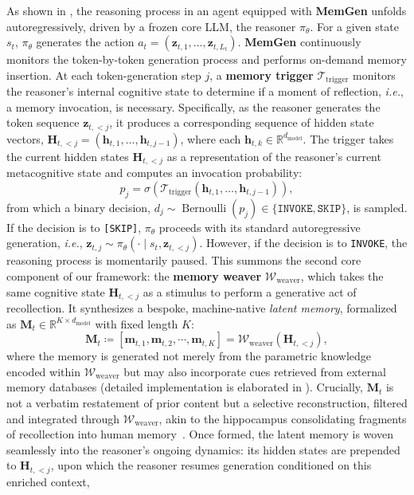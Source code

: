 \documentclass[]{fairmeta}
\newcommand{\ourmethod}{{\fontfamily{lmtt}\selectfont \textbf{MemGen}}\xspace}
\begin{document}
As shown in , the reasoning process in an agent equipped with \ourmethod unfolds autoregressively, driven by a frozen core LLM, the reasoner $\pi_\theta$. For a given state $s_t$, $\pi_\theta$ generates the action ${a}_t = (\mathbf{z}_{t,1}, \ldots, \mathbf{z}_{t,L_t})$. \ourmethod continuously monitors the token-by-token generation process and performs on-demand memory insertion. At each token-generation step $j$, a \textbf{memory trigger} $\mathcal{T}_\text{trigger}$ monitors the reasoner's internal cognitive state to determine if a moment of reflection, \textit{i.e.}, a memory invocation, is necessary.
Specifically, as the reasoner generates the token sequence $\mathbf{z}_{t,<j}$, it produces a corresponding sequence of hidden state vectors, $\mathbf{H}_{t,<j} = (\mathbf{h}_{t,1}, \ldots, \mathbf{h}_{t,j-1})$, where each $\mathbf{h}_{t,k} \in \mathbb{R}^{d_{\text{model}}}$. The trigger takes the current hidden states $\mathbf{H}_{t,<j}$ as a representation of the reasoner's current metacognitive state and computes an invocation probability:
\begin{equation}
p_j = \sigma\left(\mathcal{T}_\text{trigger}(\mathbf{h}_{t,1}, \ldots, \mathbf{h}_{t,j-1})\right),
\end{equation}
from which a binary decision, $d_j \sim \operatorname{Bernoulli}(p_j) \in \{\texttt{INVOKE}, \texttt{SKIP}\}$, is sampled.
If the decision is to \texttt{[SKIP]}, $\pi_\theta$ proceeds with its standard autoregressive generation, \textit{i.e.}, $\mathbf{z}_{t,j} \sim \pi_\theta(\cdot \mid s_t, \mathbf{z}_{t,<j})$. However, if the decision is to \texttt{INVOKE}, the reasoning process is momentarily paused. This summons the second core component of our framework: the \textbf{memory weaver} $\mathcal{W}_\text{weaver}$, which takes the same cognitive state $\mathbf{H}_{t,<j}$ as a stimulus to perform a generative act of recollection. It synthesizes a bespoke, machine-native \textit{latent memory}, formalized as $\mathbf{M}_t \in \mathbb{R}^{K \times d_{\text{model}}}$ with fixed length $K$:
\begin{equation}\label{eq:weaver}
\mathbf{M}_t \coloneq[\mathbf{m}_{t,1},\mathbf{m}_{t,2}, \cdots, \mathbf{m}_{t,K}] = \mathcal{W}_\text{weaver}(\mathbf{H}_{t,<j}),
\end{equation}
where the memory is generated not merely from the parametric knowledge encoded within $\mathcal{W}_\text{weaver}$ but may also incorporate cues retrieved from external memory databases (detailed implementation is elaborated in ). Crucially, $\mathbf{M}_t$ is not a verbatim restatement of prior content but a selective reconstruction, filtered and integrated through $\mathcal{W}_\text{weaver}$, akin to the hippocampus consolidating fragments of recollection into human memory~\citep{spens2024generativememory-nature}. Once formed, the latent memory is woven seamlessly into the reasoner’s ongoing dynamics: its hidden states are prepended to $\mathbf{H}_{t,<j}$, upon which the reasoner resumes generation conditioned on this enriched context,
\end{document}
